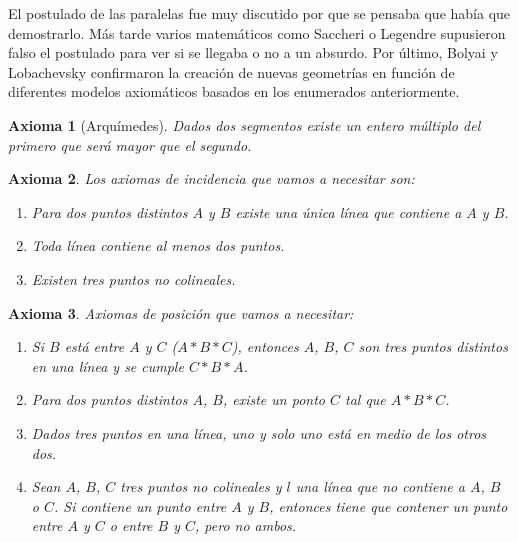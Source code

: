 \documentclass[a4paper]{amsart}
\theoremstyle{plain}
\newtheorem{axiom}{Axioma}
\begin{document}
El postulado de las paralelas fue muy discutido por que se pensaba que había que demostrarlo. Más tarde varios matemáticos como Saccheri o Legendre supusieron falso el postulado para ver si se llegaba o no a un absurdo. Por último, Bolyai y Lobachevsky confirmaron la creación de nuevas geometrías en función de diferentes modelos axiomáticos basados en los enumerados anteriormente.

\begin{axiom}[Arquímedes]\label{Arquimedes}
Dados dos segmentos existe un entero múltiplo del primero que será mayor que el segundo.
\end{axiom}

\begin{axiom}\label{incidencia}
Los axiomas de incidencia que vamos a necesitar son:
\begin{enumerate}
\item [(I1)] Para dos puntos distintos $A$ y $B$ existe una única línea que contiene a $A$ y $B$.
\item [(I2)] Toda línea contiene al menos dos puntos.
\item [(I3)] Existen tres puntos no colineales.
\end{enumerate}
\end{axiom}

\begin{axiom}\label{posicion}
Axiomas de posición que vamos a necesitar:
\begin{enumerate}
\item [(P1)] Si $B$ está entre $A$ y $C$ ($A*B*C$), entonces $A$, $B$, $C$ son tres puntos distintos en una línea y se cumple $C*B*A$.
\item [(P2)] Para dos puntos distintos $A$, $B$, existe un ponto $C$ tal que $A*B*C$.
\item [(P3)] Dados tres puntos en una línea, uno y solo uno está en medio de los otros dos.
\item [(P4)] Sean $A$, $B$, $C$ tres puntos no colineales y $l$ una línea que no contiene a $A$, $B$ o $C$. Si contiene un punto entre $A$ y $B$, entonces tiene que contener un punto entre $A$ y $C$ o entre $B$ y $C$, pero no ambos.
\end{enumerate}
\end{axiom}
\end{document}
